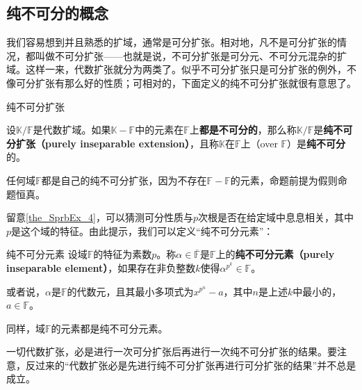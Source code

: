 


\subsection{纯不可分的概念}

我们容易想到并且熟悉的扩域，通常是可分扩张。相对地，凡不是可分扩张的情况，都叫做不可分扩张——也就是说，不可分扩张是可分元、不可分元混杂的扩域。这样一来，代数扩张就分为两类了。似乎不可分扩张只是可分扩张的例外，不像可分扩张有那么好的性质；可相对的，下面定义的纯不可分扩张就很有意思了。

\begin{definition}{纯不可分扩张}\label{def_PInsEx_2}

设$\mathbb{K}/\mathbb{F}$是代数扩域。如果$\mathbb{K}-\mathbb{F}$中的元素在$\mathbb{F}$上\textbf{都是不可分的}，那么称$\mathbb{K}/\mathbb{F}$是\textbf{纯不可分扩张（purely inseparable extension）}，且称$\mathbb{K}$在$\mathbb{F}$上（over $\mathbb{F}$）是\textbf{纯不可分}的。

\end{definition}

任何域$\mathbb{F}$都是自己的纯不可分扩张，因为不存在$\mathbb{F}-\mathbb{F}$的元素，命题前提为假则命题恒真。

留意\autoref{the_SprbEx_4}，可以猜测可分性质与$p$次根是否在给定域中息息相关，其中$p$是这个域的特征。由此提示，我们可以定义“纯不可分元素”：


\begin{definition}{纯不可分元素}\label{def_PInsEx_1}
设域$\mathbb{F}$的特征为素数$p$。称$\alpha\in\overline{\mathbb{F}}$是$\mathbb{F}$上的\textbf{纯不可分元素（purely inseparable element）}，如果存在非负整数$k$使得$\alpha^{p^k}\in\mathbb{F}$。

或者说，$\alpha$是$\mathbb{F}$的代数元，且其最小多项式为$x^{p^n}-a$，其中$n$是上述$k$中最小的，$a\in\mathbb{F}$。
\end{definition}

同样，域$\mathbb{F}$的元素都是纯不可分元素。



一切代数扩张，必是进行一次可分扩张后再进行一次纯不可分扩张的结果。要注意，反过来的“代数扩张必是先进行纯不可分扩张再进行可分扩张的结果”并不总是成立。




